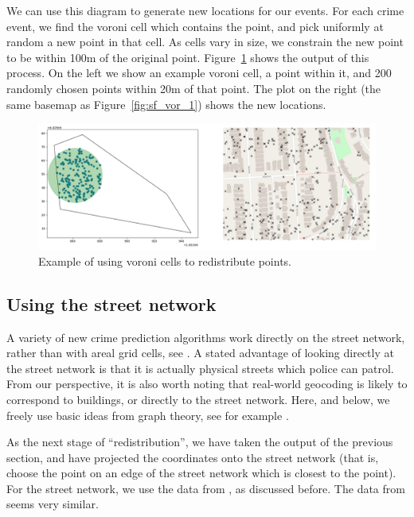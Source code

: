\documentclass[twoside,a4paper,twocolumn,10pt]{article}
\theoremstyle{plain}
\theoremstyle{definition}
\begin{document}
We can use this diagram to generate new locations for our events.  For each crime event,
we find the voroni cell which contains the point, and pick uniformly at random a new point
in that cell.  As cells vary in size, we constrain the new point to be within 100m of the
original point.  Figure~\ref{fig:sf_vor_2} shows the output of this process.  On the left
we show an example voroni cell, a point within it, and 200 randomly chosen points within 20m
of that point.  The plot on the right (the same basemap as Figure~\ref{fig:sf_vor_1})
shows the new locations.

\begin{figure}
  \includegraphics[width=\textwidth]{sf_vor_2.png}
  \caption{Example of using voroni cells to redistribute points.}
  \label{fig:sf_vor_2}
\end{figure}


\subsection{Using the street network}

A variety of new crime prediction algorithms work directly on the street network, rather
than with areal grid cells, see \cite{rosser_nw, ss}.
A stated advantage of looking directly at the street network is that it is actually
physical streets which police can patrol.  From our perspective, it is also worth noting
that real-world geocoding is likely to correspond to buildings, or directly to
the street network.  Here, and below, we freely use basic ideas from graph theory, see
for example \cite{wilson}.

As the next stage of ``redistribution'', we have taken the output of the previous section,
and have projected the coordinates onto the street network (that is, choose the point on an
edge of the street network which is closest to the point).  For the street network, we use
the data from \cite{sfgeo}, as discussed before.  The data from \cite{tiger} seems very similar.
\end{document}
